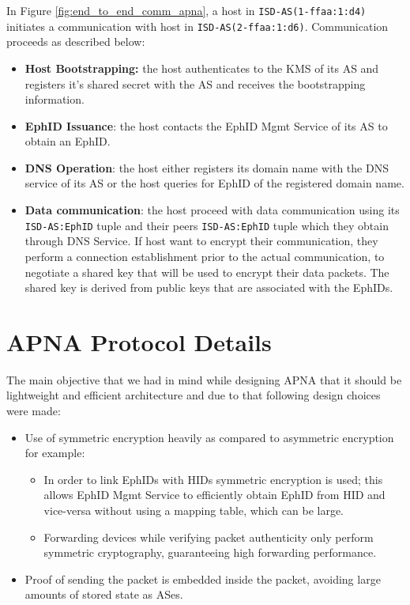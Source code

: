 In Figure \ref{fig:end_to_end_comm_apna}, a host in \texttt{ISD-AS(1-ffaa:1:d4)} initiates a communication with host in \texttt{ISD-AS(2-ffaa:1:d6)}. Communication proceeds as described below:

\begin{itemize}
    \item \textbf{Host Bootstrapping:} the host authenticates to the KMS of its AS and registers it's shared secret with the AS and receives the bootstrapping information.
    \item \textbf{EphID Issuance}: the host contacts the EphID Mgmt Service of its AS to obtain an EphID.
    \item \textbf{DNS Operation}: the host either registers its domain name with the DNS service of its AS or the host queries for EphID of the registered domain name.
    \item \textbf{Data communication}: the host proceed with data communication using its \texttt{ISD-AS:EphID} tuple and their peers \texttt{ISD-AS:EphID} tuple which they obtain through DNS Service. If host want to encrypt their communication, they perform a connection establishment prior to the actual communication, to negotiate a shared key that will be used to encrypt their data packets. The shared key is derived from public keys that are associated with the EphIDs.
\end{itemize}

\section{APNA Protocol Details}
The main objective that we had in mind while designing APNA that it should be lightweight and efficient architecture and due to that following design choices were made:

\begin{itemize}
    \item Use of symmetric encryption heavily as compared to asymmetric encryption for example:
    \begin{itemize}
        \item In order to link EphIDs with HIDs symmetric encryption is used; this allows EphID Mgmt Service to efficiently obtain EphID from HID and vice-versa without using a mapping table, which can be large.
        \item Forwarding devices while verifying packet authenticity only perform symmetric cryptography, guaranteeing high forwarding performance.
    \end{itemize}
    \item Proof of sending the packet is embedded inside the packet, avoiding large amounts of stored state as ASes. 
\end{itemize}

